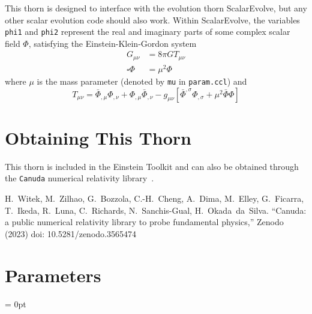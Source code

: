 This thorn is designed to interface with the evolution thorn ScalarEvolve, but any other scalar evolution code should also work. Within ScalarEvolve, the variables \texttt{phi1} and \texttt{phi2} represent the real and imaginary parts of some complex scalar field $\Phi$, satisfying the Einstein-Klein-Gordon system
\begin{align}
   G_{\mu \nu} & = 8 \pi G T_{\mu \nu} \\
 \square \Phi & = \mu^2 \Phi
\end{align}
where $\mu$ is the mass parameter (denoted by \texttt{mu} in \texttt{param.ccl}) and
\begin{equation}
  T_{\mu \nu} = \bar \Phi_{,\mu} \Phi_{,\nu} + \Phi_{,\mu} \bar \Phi_{,\nu}
                - g_{\mu \nu} [  \bar \Phi^{,\sigma} \Phi_{,\sigma}
                               + \mu^2 \bar \Phi \Phi ]
\end{equation}


\section{Obtaining This Thorn}

This thorn is included in the Einstein Toolkit and can also be obtained through the \texttt{Canuda} numerical relativity library~\cite{Canuda}.

\begin{thebibliography}{9}

H.~Witek, M.~Zilhao, G.~Bozzola, C.-H.~Cheng, A.~Dima, M.~Elley, G.~Ficarra, T.~Ikeda, R.~Luna, C.~Richards, N.~Sanchis-Gual, H.~Okada~da~Silva.
``Canuda: a public numerical relativity library to probe fundamental physics,''
Zenodo (2023)
doi: 10.5281/zenodo.3565474

\end{thebibliography}




\section{Parameters} 


\parskip = 0pt

\setlength{\tableWidth}{160mm}

\setlength{\paraWidth}{\tableWidth}
\setlength{\descWidth}{\tableWidth}
\settowidth{\maxVarWidth}{evolution\_method}

\addtolength{\paraWidth}{-\maxVarWidth}
\addtolength{\paraWidth}{-\columnsep}
\addtolength{\paraWidth}{-\columnsep}
\addtolength{\paraWidth}{-\columnsep}

